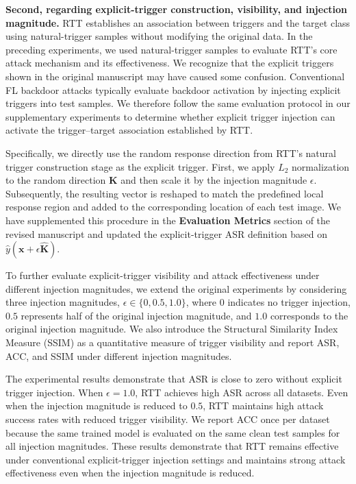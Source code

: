 \documentclass[11pt,a4paper]{article}
\newcommand{\manualindent}{\par\noindent\hspace*{1.5em}\ignorespaces}
\begin{document}
{\manualindent \textbf{Second, regarding explicit-trigger construction, visibility, and injection magnitude.}
RTT establishes an association between triggers and the target class using natural-trigger samples without modifying the original data. In the preceding experiments, we used natural-trigger samples to evaluate RTT’s core attack mechanism and its effectiveness.
We recognize that the explicit triggers shown in the original manuscript may have caused some confusion. 
Conventional FL backdoor attacks typically evaluate backdoor activation by injecting explicit triggers into test samples. 
We therefore follow the same evaluation protocol in our supplementary experiments to determine whether explicit trigger injection can activate the trigger–target association established by RTT.

\manualindent Specifically, we directly use the random response direction from RTT's natural trigger construction stage as the explicit trigger. 
First, we apply $L_2$ normalization to the random direction $\mathbf K$ and then scale it by the injection magnitude $\epsilon$. 
Subsequently, the resulting vector is reshaped to match the predefined local response region and added to the corresponding location of each test image. 
We have supplemented this procedure in the \textbf{Evaluation Metrics} section of the revised manuscript and updated the explicit-trigger ASR definition based on $\hat{y}(\mathbf{x}+\epsilon\hat{\mathbf K})$.

\manualindent To further evaluate explicit-trigger visibility and attack effectiveness under different injection magnitudes, we extend the original experiments by considering three injection magnitudes, $\epsilon\in\{0,0.5,1.0\}$, where $0$ indicates no trigger injection, $0.5$ represents half of the original injection magnitude, and $1.0$ corresponds to the original injection magnitude. 
We also introduce the Structural Similarity Index Measure (SSIM) as a quantitative measure of trigger visibility and report ASR, ACC, and SSIM under different injection magnitudes.

\manualindent The experimental results demonstrate that ASR is close to zero without explicit trigger injection. When $\epsilon=1.0$, RTT achieves high ASR across all datasets. 
Even when the injection magnitude is reduced to $0.5$, RTT maintains high attack success rates with reduced trigger visibility. 
We report ACC once per dataset because the same trained model is evaluated on the same clean test samples for all injection magnitudes.
These results demonstrate that RTT remains effective under conventional explicit-trigger injection settings and maintains strong attack effectiveness even when the injection magnitude is reduced.
}
\end{document}
